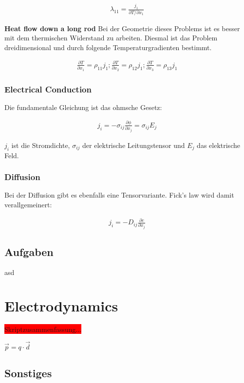 \documentclass[a4paper]{scrartcl}
\begin{document}
\begin{align}
\lambda_{11}=\frac{j_1}{\partial T/ \partial x_1}
\end{align}

\textbf{Heat flow down a long rod}
Bei der Geometrie dieses Problems ist es besser mit dem thermischen Widerstand
zu arbeiten. Diesmal ist das Problem dreidimensional und durch folgende
Temperaturgradienten bestimmt.

\begin{align}
\frac{\partial T}{\partial x_1}=\rho_{11}j_1; \frac{\partial T}{\partial
x_2}=\rho_{12}j_1; \frac{\partial T}{\partial x_3}=\rho_{13}j_1
\end{align}

\subsubsection{Electrical Conduction}
Die fundamentale Gleichung ist das ohmsche Gesetz:

\begin{align}
j_i=-\sigma_{ij}\frac{\partial \phi}{\partial x_j}=\sigma_{ij}E_j
\end{align}

$j_i$ ist die Stromdichte, $\sigma_{ij}$ der elektrische Leitungstensor und
$E_j$ das elektrische Feld.

\subsubsection{Diffusion}
Bei der Diffusion gibt es ebenfalls eine Tensorvariante. Fick's law wird damit
verallgemeinert:

\begin{align}
j_i=-D_{ij}\frac{\partial c}{\partial x_j}
\end{align}

\subsection{Aufgaben}
asd

\section{Electrodynamics}

\colorbox{red}{Skriptzusammenfassung...}

$ \vec{p}=q\cdot\vec{d} $


\subsection{Sonstiges}
\end{document}
